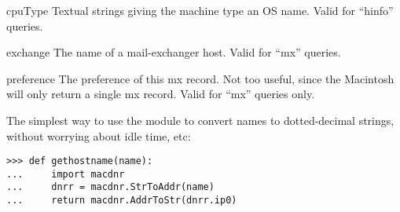 \begin{memberdesc}{cpuType}
Textual strings giving the machine type an OS name.  Valid for ``hinfo''
queries.
\end{memberdesc}

\begin{memberdesc}{exchange}
The name of a mail-exchanger host.  Valid for ``mx'' queries.
\end{memberdesc}

\begin{memberdesc}{preference}
The preference of this mx record.  Not too useful, since the Macintosh
will only return a single mx record.  Valid for ``mx'' queries only.
\end{memberdesc}

The simplest way to use the module to convert names to dotted-decimal
strings, without worrying about idle time, etc:
\begin{verbatim}
>>> def gethostname(name):
...     import macdnr
...     dnrr = macdnr.StrToAddr(name)
...     return macdnr.AddrToStr(dnrr.ip0)
\end{verbatim}
